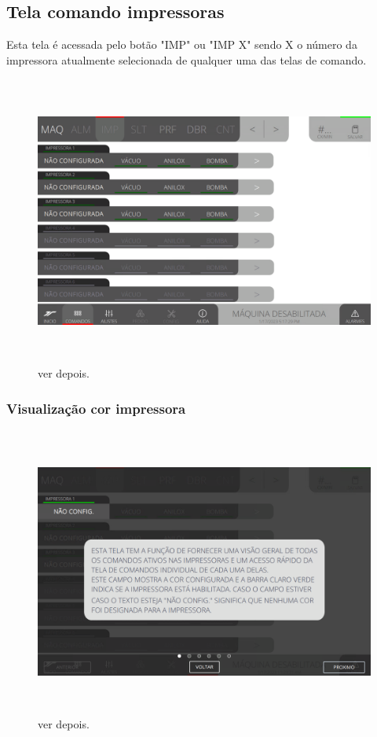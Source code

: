 \thispagestyle{fancy}
\vspace*{45pt}
\subsection{Tela comando impressoras}
 Esta tela é acessada pelo botão "IMP" ou "IMP X" sendo X o número da impressora atualmente selecionada de qualquer uma das telas de comando.
\begin{figure}[h]
  \centering
  \includegraphics[width=576px,height=360px]{src/images/04-printter/01-printters/commands/e-Tela-Principal.png}
  \caption{ver depois.}
   \label{}
\end{figure}

\newpage
\thispagestyle{fancy}
\vspace*{\fill}
\subsubsection{\small{Visualização cor impressora}}
\begin{figure}[h]
  \centering
  \includegraphics[width=576px,height=360px]{src/images/04-printter/01-printters/commands/e-1.png}
  \caption{ver depois.}
   \label{}
\end{figure}
\vspace*{\fill}


